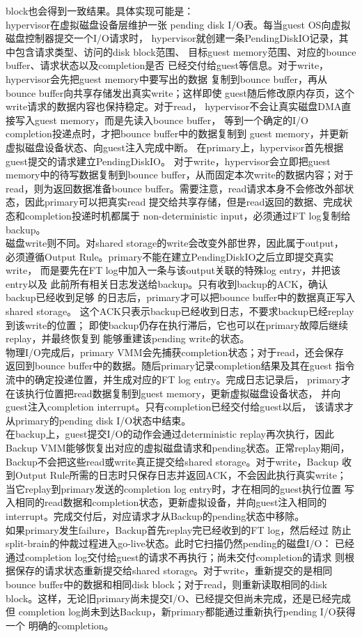 {block也会得到一致结果。具体实现可能是：
\\hypervisor在虚拟磁盘设备层维护一张%
pending disk I/O表。每当guest OS向虚拟磁盘控制器提交一个I/O请求时，%
hypervisor就创建一条PendingDiskIO记录，其中包含请求类型、访问的disk block范围、%
目标guest memory范围、对应的bounce buffer、请求状态以及completion是否%
已经交付给guest等信息。对于write，hypervisor会先把guest memory中要写出的数据%
复制到bounce buffer，再从bounce buffer向共享存储发出真实write；这样即使%
guest随后修改原内存页，这个write请求的数据内容也保持稳定。对于read，%
hypervisor不会让真实磁盘DMA直接写入guest memory，而是先读入bounce buffer，%
等到一个确定的I/O completion投递点时，才把bounce buffer中的数据复制到%
guest memory，并更新虚拟磁盘设备状态、向guest注入完成中断。%
在primary上，hypervisor首先根据guest提交的请求建立PendingDiskIO。%
对于write，hypervisor会立即把guest memory中的待写数据复制到bounce %
buffer，从而固定本次write的数据内容；对于read，则为返回数据准备bounce %
buffer。需要注意，read请求本身不会修改外部状态，因此primary可以把真实read%
提交给共享存储，但是read返回的数据、完成状态和completion投递时机都属于%
non-deterministic input，必须通过FT log复制给backup。%
\\磁盘write则不同。对shared storage的write会改变外部世界，因此属于output，%
必须遵循Output Rule。primary不能在建立PendingDiskIO之后立即提交真实write，%
而是要先在FT log中加入一条与该output关联的特殊log entry，并把该entry以及%
此前所有相关日志发送给backup。只有收到backup的ACK，确认backup已经收到足够%
的日志后，primary才可以把bounce buffer中的数据真正写入shared storage。%
这个ACK只表示backup已经收到日志，不要求backup已经replay到该write的位置；%
即使backup仍存在执行滞后，它也可以在primary故障后继续replay，并最终恢复到%
能够重建该pending write的状态。%
\\物理I/O完成后，primary VMM会先捕获completion状态；对于read，还会保存%
返回到bounce buffer中的数据。随后primary记录completion结果及其在guest%
指令流中的确定投递位置，并生成对应的FT log entry。完成日志记录后，%
primary才在该执行位置把read数据复制到guest memory，更新虚拟磁盘设备状态，%
并向guest注入completion interrupt。只有completion已经交付给guest以后，%
该请求才从primary的pending disk I/O状态中结束。%
\\在backup上，guest提交I/O的动作会通过deterministic replay再次执行，因此%
Backup VMM能够恢复出对应的虚拟磁盘请求和pending状态。正常replay期间，%
Backup不会把这些read或write真正提交给shared storage。对于write，Backup%
收到Output Rule所需的日志时只保存日志并返回ACK，不会因此执行真实write；%
当它replay到primary发送的completion log entry时，才在相同的guest执行位置%
写入相同的read数据和completion状态，更新虚拟设备，并向guest注入相同的%
interrupt。完成交付后，对应请求才从Backup的pending状态中移除。%
\\如果primary发生failure，Backup首先replay完已经收到的FT log，然后经过%
防止split-brain的仲裁过程进入go-live状态。此时它扫描仍然pending的磁盘I/O：%
已经通过completion log交付给guest的请求不再执行；尚未交付completion的请求%
则根据保存的请求状态重新提交给shared storage。对于write，重新提交的是相同%
bounce buffer中的数据和相同disk block；对于read，则重新读取相同的disk %
block。这样，无论旧primary尚未提交I/O、已经提交但尚未完成，还是已经完成但%
completion log尚未到达Backup，新primary都能通过重新执行pending I/O获得一个%
明确的completion。}%

